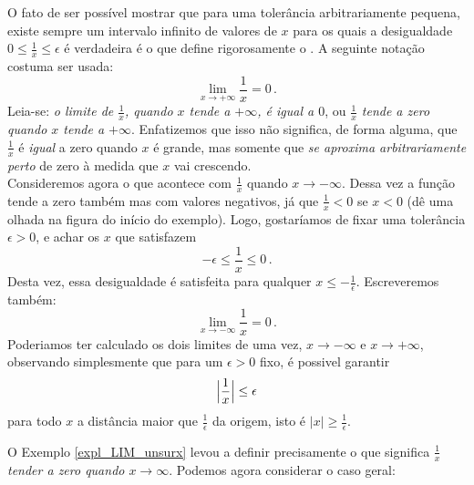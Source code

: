 \begin{ex}
\begin{center}
\begin{bmlimage}\end{bmlimage}
\end{center}
O fato de ser possível mostrar que
para uma tolerância arbitrariamente pequena,
existe sempre um intervalo infinito de valores de $x$ para os quais a desigualdade
$0\leq \frac1x\leq \epsilon$
é verdadeira é o que define rigorosamente o 
. A seguinte notação costuma ser
usada:
$$
\boxed{\lim_{x\to +\infty}\frac{1}{x}=0\,.}$$
Leia-se: \emph{o limite de $\frac1x$, quando $x$ tende a $+\infty$, é
igual a $0$}, ou \emph{
$\frac{1}{x}$ tende a zero quando $x$ tende a $+\infty$}. 
Enfatizemos que isso não significa, de forma alguma,
que $\tfrac{1}{x}$ é \emph{igual} a zero quando $x$ é grande, mas somente que
\emph{se aproxima arbitrariamente perto} de zero à medida que $x$ vai
crescendo.\\

Consideremos agora o que acontece com $\tfrac1x$ quando $x\to-\infty$. 
Dessa vez a função tende a
zero também mas com valores negativos, já que $\tfrac1x<0$ se $x<0$
(dê uma olhada na figura do início do exemplo). 
Logo, gostaríamos de fixar uma tolerância $\epsilon>0$, e achar os $x$ que satisfazem 
\[ 
-\epsilon\leq \frac1x\leq 0\,.
\]
Desta vez, essa desigualdade é satisfeita para qualquer 
$x\leq -\frac1\epsilon$. Escreveremos também:
$$\boxed{\lim_{x\to -\infty}\frac{1}{x}=0\,.}$$
Poderiamos ter calculado os dois limites de uma vez, $x\to -\infty$ e
$x\to+\infty$, 
observando simplesmente que para um $\epsilon>0$ fixo,
é possivel garantir 
\[\Bigl|\frac{1}{x}\Bigr|\leq \epsilon\] 
para todo $x$ a distância maior que $\frac1\epsilon$ da origem, isto é
$|x|\geq \frac1\epsilon$.
\end{ex}

O Exemplo \ref{expl_LIM_unsurx} levou a definir precisamente o que
significa \emph{$\tfrac1x$ tender a zero quando $x\to\infty$}. 
Podemos agora considerar o caso geral:

